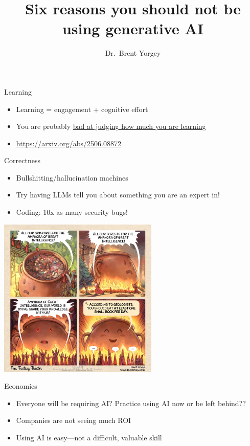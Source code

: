 \documentclass[xcolor={usenames,dvipsnames,svgnames,table},12pt]{beamer}
\title{Six reasons you should not be using generative AI}
\date{}
\author{Dr.\ Brent Yorgey}
\begin{document}
\maketitle

\begin{frame}{Learning}
  \begin{itemize}
  \item Learning = engagement + cognitive effort
  \item You are probably \href{https://www.pnas.org/doi/10.1073/pnas.1821936116}{bad at judging how much you are learning}
  \item \url{https://arxiv.org/abs/2506.08872}
  \end{itemize}
\end{frame}

\begin{frame}{Correctness}
  \begin{itemize}
  \item Bullshitting/hallucination machines
  \item Try having LLMs tell you about something you are an expert in!
  \item Coding: 10x as many security bugs!
  \end{itemize}
\end{frame}

\begin{frame}
  \begin{center}
    \includegraphics[width=3in]{AGI}
  \end{center}
\end{frame}

\begin{frame}{Economics}
  \begin{itemize}
  \item Everyone will be requiring AI? Practice using AI now or
    be left behind??
  \item Companies are not seeing much ROI
  \item Using AI is easy---not a difficult, valuable skill
  \end{itemize}
\end{frame}
\end{document}
